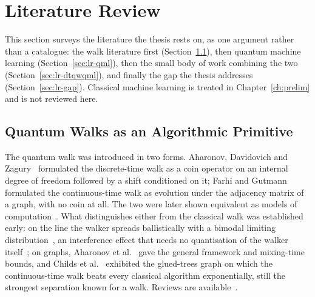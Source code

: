 \section{Literature Review}
\label{ch:litreview}

This section surveys the literature the thesis rests on, as one argument
rather than a catalogue: the walk literature first
(Section~\ref{sec:lr-primitive}), then quantum machine learning
(Section~\ref{sec:lr-qml}), then the small body of work combining the two
(Section~\ref{sec:lr-dtqwqml}), and finally the gap the thesis addresses
(Section~\ref{sec:lr-gap}). Classical machine learning is treated in
Chapter~\ref{ch:prelim} and is not reviewed here.

\subsection{Quantum Walks as an Algorithmic Primitive}
\label{sec:lr-primitive}

The quantum walk was introduced in two forms. Aharonov, Davidovich and
Zagury~\cite{Aharonov_1993} formulated the discrete-time walk as a coin
operator on an internal degree of freedom followed by a shift conditioned on
it; Farhi and Gutmann~\cite{Farhi_1997} formulated the continuous-time walk as
evolution under the adjacency matrix of a graph, with no coin at all. The two
were later shown equivalent as models of computation~\cite{Childs2010,
strauch2006connecting}. What distinguishes either from the classical walk was
established early: on the line the walker spreads ballistically with a
bimodal limiting distribution~\cite{Ambainis_2001, Konno_2002, Grimmett_2003},
an interference effect that needs no quantisation of the walker
itself~\cite{Knight_2003}; on graphs, Aharonov et al.~\cite{Aharonov_2000}
gave the general framework and mixing-time bounds, and Childs et
al.~\cite{Childs_2001, Childs_2002} exhibited the glued-trees graph on which
the continuous-time walk beats every classical algorithm exponentially, still
the strongest separation known for a walk. Reviews are
available~\cite{Elias_2012, Kadian_2021, Xiaogang_2024}.


